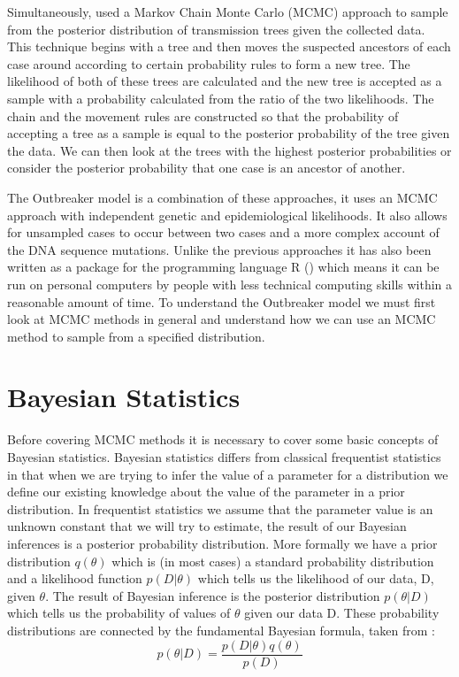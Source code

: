 \documentclass[11pt,a4paper]{report}
\begin{document}
Simultaneously, \citet{Morelli12} used a Markov Chain Monte Carlo (MCMC) approach to sample from the posterior distribution of transmission trees given the collected data. This technique begins with a tree and then moves the suspected ancestors of each case around according to certain probability rules to form a new tree. The likelihood of both of these trees are calculated and the new tree is accepted as a sample with a probability calculated from the ratio of the two likelihoods. The chain and the movement rules are constructed so that the probability of accepting a tree as a sample is equal to the posterior probability of the tree given the data. We can then look at the trees with the highest posterior probabilities or consider the posterior probability that one case is an ancestor of another.

The Outbreaker model is a combination of these approaches, it uses an MCMC approach with independent genetic and epidemiological likelihoods. It also allows for unsampled cases to occur between two cases and a more complex account of the DNA sequence mutations. Unlike the previous approaches it has also been written as a package for the programming language R (\citet{R14}) which means it can be run on personal computers by people with less technical computing skills within a reasonable amount of time. To understand the Outbreaker model we must first look at MCMC methods in general and understand how we can use an MCMC method to sample from a specified distribution.

\section{Bayesian Statistics}
Before covering MCMC methods it is necessary to cover some basic concepts of Bayesian statistics. Bayesian statistics differs from classical frequentist statistics in that when we are trying to infer the value of a parameter for a distribution we define our existing knowledge about the value of the parameter in a prior distribution. In frequentist statistics we assume that the parameter value is an unknown constant that we will try to estimate, the result of our Bayesian inferences is a posterior probability distribution. More formally we have a prior distribution $q(\theta)$ which is (in most cases) a standard probability distribution and a likelihood function $p(D | \theta)$ which tells us the likelihood of our data, D, given $\theta$. The result of Bayesian inference is the posterior distribution $p(\theta | D)$ which tells us the probability of values of $\theta$ given our data D. These probability distributions are connected by the fundamental Bayesian formula, taken from \citet{Robert07}:
\begin{equation}
p(\theta | D) = \frac{p(D | \theta)q(\theta)}{p(D)}
\end{equation}
\end{document}
